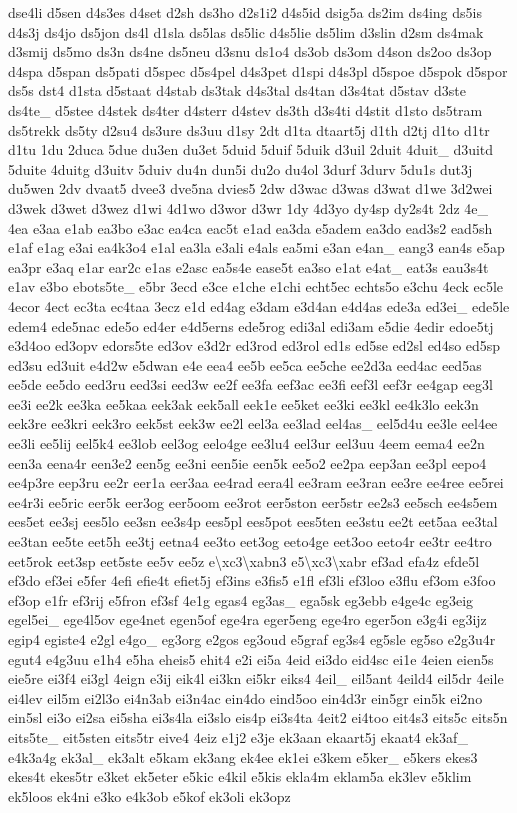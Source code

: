 \begin{DoxyCompactItemize}
dse4li d5sen d4s3es d4set d2sh ds3ho d2s1i2 d4s5id dsig5a ds2im ds4ing ds5is d4s3j ds4jo ds5jon ds4l d1sla ds5las ds5lic d4s5lie ds5lim d3slin d2sm ds4mak d3smij ds5mo ds3n ds4ne ds5neu d3snu ds1o4 ds3ob ds3om d4son ds2oo ds3op d4spa d5span ds5pati d5spec d5s4pel d4s3pet d1spi d4s3pl d5spoe d5spok d5spor ds5s dst4 d1sta d5staat d4stab ds3tak d4s3tal ds4tan d3s4tat d5stav d3ste ds4te\-\_\- d5stee d4stek ds4ter d4sterr d4stev ds3th d3s4ti d4stit d1sto ds5tram ds5trekk ds5ty d2su4 ds3ure ds3uu d1sy 2dt d1ta dtaart5j d1th d2tj d1to d1tr d1tu 1du 2duca 5due du3en du3et 5duid 5duif 5duik d3uil 2duit 4duit\-\_\- d3uitd 5duite 4duitg d3uitv 5duiv du4n dun5i du2o du4ol 3durf 3durv 5du1s dut3j du5wen 2dv dvaat5 dvee3 dve5na dvies5 2dw d3wac d3was d3wat d1we 3d2wei d3wek d3wet d3wez d1wi 4d1wo d3wor d3wr 1dy 4d3yo dy4sp dy2s4t 2dz 4e\-\_\- 4ea e3aa e1ab ea3bo e3ac ea4ca eac5t e1ad ea3da e5adem ea3do ead3s2 ead5sh e1af e1ag e3ai ea4k3o4 e1al ea3la e3ali e4als ea5mi e3an e4an\-\_\- eang3 ean4s e5ap ea3pr e3aq e1ar ear2c e1as e2asc ea5s4e ease5t ea3so e1at e4at\-\_\- eat3s eau3s4t e1av e3bo ebots5te\-\_\- e5br 3ecd e3ce e1che e1chi echt5ec echts5o e3chu 4eck ec5le 4ecor 4ect ec3ta ec4taa 3ecz e1d ed4ag e3dam e3d4an e4d4as ede3a ed3ei\-\_\- ede5le edem4 ede5nac ede5o ed4er e4d5erns ede5rog edi3al edi3am e5die 4edir edoe5tj e3d4oo ed3opv edors5te ed3ov e3d2r ed3rod ed3rol ed1s ed5se ed2sl ed4so ed5sp ed3su ed3uit e4d2w e5dwan e4e eea4 ee5b ee5ca ee5che ee2d3a eed4ac eed5as ee5de ee5do eed3ru eed3si eed3w ee2f ee3fa eef3ac ee3fi eef3l eef3r ee4gap eeg3l ee3i ee2k ee3ka ee5kaa eek3ak eek5all eek1e ee5ket ee3ki ee3kl ee4k3lo eek3n eek3re ee3kri eek3ro eek5st eek3w ee2l eel3a ee3lad eel4as\-\_\- eel5d4u ee3le eel4ee ee3li ee5lij eel5k4 ee3lob eel3og eelo4ge ee3lu4 eel3ur eel3uu 4eem eema4 ee2n een3a eena4r een3e2 een5g ee3ni een5ie een5k ee5o2 ee2pa eep3an ee3pl eepo4 ee4p3re eep3ru ee2r eer1a eer3aa ee4rad eera4l ee3ram ee3ran ee3re ee4ree ee5rei ee4r3i ee5ric eer5k eer3og eer5oom ee3rot eer5ston eer5str ee2s3 ee5sch ee4s5em ees5et ee3sj ees5lo ee3sn ee3s4p ees5pl ees5pot ees5ten ee3stu ee2t eet5aa ee3tal ee3tan ee5te eet5h ee3tj eetna4 ee3to eet3og eeto4ge eet3oo eeto4r ee3tr ee4tro eet5rok eet3sp eet5ste ee5v ee5z e\textbackslash{}xc3\textbackslash{}xabn3 e5\textbackslash{}xc3\textbackslash{}xabr ef3ad efa4z efde5l ef3do ef3ei e5fer 4efi efie4t efiet5j ef3ins e3fis5 e1fl ef3li ef3loo e3flu ef3om e3foo ef3op e1fr ef3rij e5fron ef3sf 4e1g egas4 eg3as\-\_\- ega5sk eg3ebb e4ge4c eg3eig egel5ei\-\_\- ege4l5ov ege4net egen5of ege4ra eger5eng ege4ro eger5on e3g4i eg3ijz egip4 egiste4 e2gl e4go\-\_\- eg3org e2gos eg3oud e5graf eg3s4 eg5sle eg5so e2g3u4r egut4 e4g3uu e1h4 e5ha eheis5 ehit4 e2i ei5a 4eid ei3do eid4sc ei1e 4eien eien5s eie5re ei3f4 ei3gl 4eign e3ij eik4l ei3kn ei5kr eiks4 4eil\-\_\- eil5ant 4eild4 eil5dr 4eile ei4lev eil5m ei2l3o ei4n3ab ei3n4ac ein4do eind5oo ein4d3r ein5gr ein5k ei2no ein5sl ei3o ei2sa ei5sha ei3s4la ei3slo eis4p ei3s4ta 4eit2 ei4too eit4s3 eits5c eits5n eits5te\-\_\- eit5sten eits5tr eive4 4eiz e1j2 e3je ek3aan ekaart5j ekaat4 ek3af\-\_\- e4k3a4g ek3al\-\_\- ek3alt e5kam ek3ang ek4ee ek1ei e3kem e5ker\-\_\- e5kers ekes3 ekes4t ekes5tr e3ket ek5eter e5kic e4kil e5kis ekla4m eklam5a ek3lev e5klim ek5loos ek4ni e3ko e4k3ob e5kof ek3oli ek3opz 
\end{DoxyCompactItemize}
